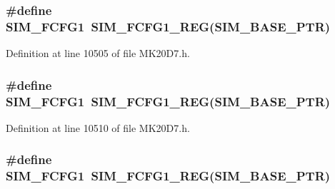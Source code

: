 \subsubsection[{\texorpdfstring{S\+I\+M\+\_\+\+F\+C\+F\+G1}{SIM_FCFG1}}]{\setlength{\rightskip}{0pt plus 5cm}\#define S\+I\+M\+\_\+\+F\+C\+F\+G1~{\bf S\+I\+M\+\_\+\+F\+C\+F\+G1\+\_\+\+R\+EG}({\bf S\+I\+M\+\_\+\+B\+A\+S\+E\+\_\+\+P\+TR})}\hypertarget{group___s_i_m___register___accessor___macros_ga644c9cc3008071efd123fb33f2d32557}{}\label{group___s_i_m___register___accessor___macros_ga644c9cc3008071efd123fb33f2d32557}


Definition at line 10505 of file M\+K20\+D7.\+h.

\subsubsection[{\texorpdfstring{S\+I\+M\+\_\+\+F\+C\+F\+G1}{SIM_FCFG1}}]{\setlength{\rightskip}{0pt plus 5cm}\#define S\+I\+M\+\_\+\+F\+C\+F\+G1~{\bf S\+I\+M\+\_\+\+F\+C\+F\+G1\+\_\+\+R\+EG}({\bf S\+I\+M\+\_\+\+B\+A\+S\+E\+\_\+\+P\+TR})}\hypertarget{group___s_i_m___register___accessor___macros_ga644c9cc3008071efd123fb33f2d32557}{}\label{group___s_i_m___register___accessor___macros_ga644c9cc3008071efd123fb33f2d32557}


Definition at line 10510 of file M\+K20\+D7.\+h.

\subsubsection[{\texorpdfstring{S\+I\+M\+\_\+\+F\+C\+F\+G1}{SIM_FCFG1}}]{\setlength{\rightskip}{0pt plus 5cm}\#define S\+I\+M\+\_\+\+F\+C\+F\+G1~{\bf S\+I\+M\+\_\+\+F\+C\+F\+G1\+\_\+\+R\+EG}({\bf S\+I\+M\+\_\+\+B\+A\+S\+E\+\_\+\+P\+TR})}\hypertarget{group___s_i_m___register___accessor___macros_ga644c9cc3008071efd123fb33f2d32557}{}\label{group___s_i_m___register___accessor___macros_ga644c9cc3008071efd123fb33f2d32557}


